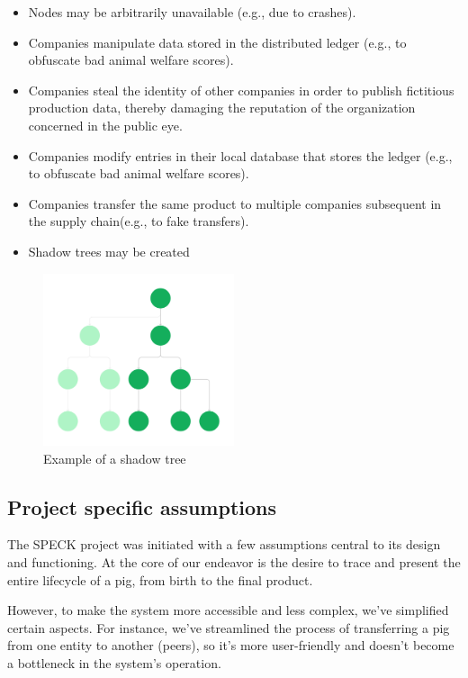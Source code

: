 \documentclass[oneside,a4paper,12pt, colorinlistoftodos]{article} %
\begin{document}
\begin{itemize}
    \item Nodes may be arbitrarily unavailable (e.g., due to crashes).
    \item Companies manipulate data stored in the distributed ledger (e.g., to obfuscate bad animal welfare scores).
    \item Companies steal the identity of other companies in order to publish fictitious production data, thereby damaging the reputation of the organization concerned in the public eye.
    \item Companies modify entries in their local database that stores the ledger (e.g., to obfuscate bad animal welfare scores).
    \item Companies transfer the same product to multiple companies subsequent in the supply chain(e.g., to fake transfers).
    \item Shadow trees may be created
    
    
\end{itemize}

\begin{figure}[bth]
    \centering
    \includegraphics[width=0.5\textwidth]{images/shadow_tree.pdf}
    \caption{Example of a shadow tree}
    \label{fig:shadow_tree}
\end{figure}

\subsection{Project specific assumptions}\label{se:project_assumptions}

The SPECK project was initiated with a few assumptions central to its design and functioning. At the core of our endeavor is the desire to trace and present the entire lifecycle of a pig, from birth to the final product.

However, to make the system more accessible and less complex, we've simplified certain aspects. For instance, we've streamlined the process of transferring a pig from one entity to another (peers), so it's more user-friendly and doesn't become a bottleneck in the system's operation.
\end{document}
